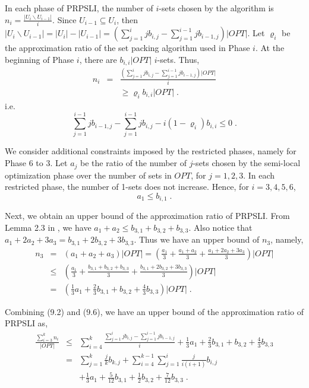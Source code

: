 \documentclass[runningheads,a4paper]{llncs}
\numberwithin{equation}{section}
\begin{document}
In each phase of PRPSLI, the number of $i$-sets chosen by the algorithm is $n_i=\frac{|U_i\backslash U_{i-1}|}{i}$. Since $U_{i-1}\subseteq U_i$, then $|U_i\backslash U_{i-1}|=|U_i|-|U_{i-1}|=(\sum_{j=1}^i jb_{i,j}-\sum_{j=1}^{i-1}jb_{i-1,j})|OPT|$. Let $\varrho_i$ be the approximation ratio of the set packing algorithm used in Phase $i$. At the beginning of Phase $i$, there are $b_{i,i}|OPT|$ $i$-sets. Thus,
\begin{eqnarray}
n_i &=& \frac{(\sum_{j=1}^i jb_{i,j}-\sum_{j=1}^{i-1}jb_{i-1,j})|OPT|}{i} \\
&&{} \geq \varrho_i b_{i,i}|OPT| \; .
\end{eqnarray}
i.e.
\begin{equation}
\sum_{j=1}^{i-1} jb_{i-1,j}-\sum_{j=1}^{i-1}jb_{i,j}-i(1-\varrho_i) b_{i,i}\leq 0 \; .
\end{equation}

We consider additional constraints imposed by the restricted phases, namely for Phase 6 to 3. Let $a_j$ be the ratio of the number of $j$-sets chosen by the semi-local optimization phase over the number of sets in $OPT$, for $j=1,2,3$. In each restricted phase, the number of 1-sets does not increase. Hence, for $i=3,4,5,6$,
\begin{equation}
a_1\leq b_{i,1} \; .
\end{equation}

Next, we obtain an upper bound of the approximation ratio of PRPSLI. From Lemma 2.3 in \cite{furer}, we have $a_1+a_2\leq b_{3,1}+b_{3,2}+b_{3,3}$. Also notice that $a_1+2a_2+3a_3=b_{3,1}+2b_{3,2}+3b_{3,3}$. Thus we have an upper bound of $n_3$, namely,
\begin{eqnarray}
n_3 &=& (a_1+a_2+a_3)|OPT|=(\frac{a_1}{3}+\frac{a_1+a_2}{3}+\frac{a_1+2a_2+3a_3}{3})|OPT| \nonumber \\
&\leq& (\frac{a_1}{3}+\frac{b_{3,1}+b_{3,2}+b_{3,3}}{3}+\frac{b_{3,1}+2b_{3,2}+3b_{3,3}}{3})|OPT| \nonumber \\
&=& (\frac{1}{3}a_1+\frac{2}{3}b_{3,1}+b_{3,2}+\frac{4}{3}b_{3,3})|OPT| \; .
\end{eqnarray}

Combining (9.2) and (9.6), we have an upper bound of the approximation ratio of PRPSLI as,
\begin{eqnarray}
\frac{\sum_{i=3}^k n_i}{|OPT|} &\leq& \sum_{i=4}^k \frac{\sum_{j=1}^i jb_{i,j}-\sum_{j=1}^{i-1}jb_{i-1,j}}{i}+\frac{1}{3}a_1+\frac{2}{3}b_{3,1}+b_{3,2}+\frac{4}{3}b_{3,3} \nonumber \\
&=& \sum_{j=1}^k \frac{j}{k}b_{k,j}+\sum_{i=4}^{k-1}\sum_{j=1}^i \frac{j}{i(i+1)}b_{i,j}\nonumber \\
&&+\frac{1}{3}a_1+\frac{5}{12}b_{3,1}+\frac{1}{2}b_{3,2}+\frac{7}{12}b_{3,3} \; .
\end{eqnarray}
\end{document}
